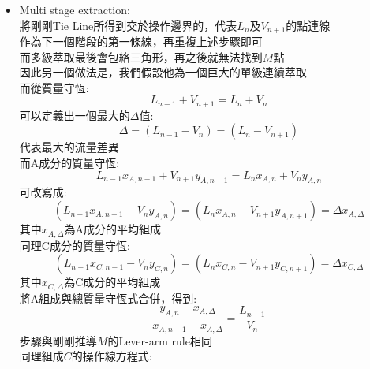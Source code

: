 \documentclass[../main.tex]{subfiles}
\begin{document}
\begin{itemize}
\begin{itemize}
\begin{align}
      x_{C,M} &= \frac{L_{n-1}x_{C,n-1}+V_{n+1}y_{C,n+1}}{L_{n-1}+V_{n+1}}
    \end{align}
    再從$M$點依照上述Tie Line的畫法，選擇不同的$x_A$值\\
    以Try-and-Error的方式，找到Tie Line剛好與第一條的直線相交於$M$點\\
    而那條Tie Line 的延伸線，與等腰直角三角形的邊界相交的兩點\\
    即為送至下一階段的$L_n,V_n$組成
    \item Multi stage extraction:\\
    將剛剛Tie Line所得到交於操作邊界的，代表$L_{n}$及$V_{n+1}$的點連線\\
    作為下一個階段的第一條線，再重複上述步驟即可\\
    而多級萃取最後會包絡三角形，再之後就無法找到$M$點\\
    因此另一個做法是，我們假設他為一個巨大的單級連續萃取\\
    而從質量守恆:
    \begin{equation}
      L_{n-1}+V_{n+1} = L_n + V_n
    \end{equation}
    可以定義出一個最大的$\Delta$值:
    \begin{equation}
      \Delta = (L_{n-1}-V_n) = (L_n - V_{n+1})
    \end{equation}
    代表最大的流量差異\\
    而A成分的質量守恆:
    \begin{equation}
      L_{n-1}x_{A,n-1}+V_{n+1}y_{A,n+1} = L_nx_{A,n}+V_ny_{A,n}
    \end{equation}
    可改寫成:
    \begin{equation}
      (L_{n-1}x_{A,n-1}-V_ny_{A,n}) = (L_nx_{A,n}-V_{n+1}y_{A,n+1}) = \Delta x_{A,\Delta}
    \end{equation}
    其中$x_{A,\Delta}$為A成分的平均組成\\
    同理C成分的質量守恆:
    \begin{equation}
      (L_{n-1}x_{C,n-1}-V_ny_{C,n}) = (L_nx_{C,n}-V_{n+1}y_{C,n+1}) = \Delta x_{C,\Delta}
    \end{equation}
    其中$x_{C,\Delta}$為C成分的平均組成\\
    將A組成與總質量守恆式合併，得到:
    \begin{equation}
      \frac{y_{A,n}-x_{A,\Delta}}{x_{A,n-1}-x_{A,\Delta}}=\frac{L_{n-1}}{V_n}
    \end{equation}
    步驟與剛剛推導$M$的Lever-arm rule相同\\
    同理組成$C$的操作線方程式:

\end{itemize}
\end{itemize}
\end{document}
